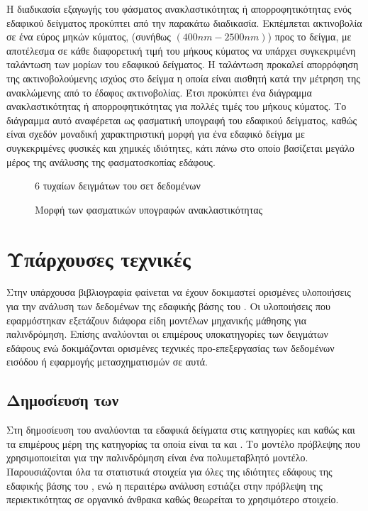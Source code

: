 Η διαδικασία εξαγωγής του φάσματος ανακλαστικότητας ή απορροφητικότητας ενός εδαφικού δείγματος προκύπτει από την παρακάτω διαδικασία. Εκπέμπεται ακτινοβολία σε ένα εύρος μηκών κύματος, (συνήθως $\left(400nm -
2500nm\right)$) προς το δείγμα, με αποτέλεσμα σε κάθε διαφορετική τιμή του μήκους κύματος να υπάρχει συγκεκριμένη ταλάντωση των μορίων του εδαφικού δείγματος. Η ταλάντωση προκαλεί απορρόφηση της ακτινοβολούμενης ισχύος στο δείγμα η οποία είναι αισθητή κατά την μέτρηση της ανακλώμενης από το έδαφος ακτινοβολίας. Έτσι προκύπτει ένα διάγραμμα ανακλαστικότητας ή απορροφητικότητας για πολλές τιμές του μήκους κύματος. Το διάγραμμα αυτό αναφέρεται ως φασματική υπογραφή του εδαφικού δείγματος, καθώς είναι σχεδόν μοναδική χαρακτηριστική μορφή για ένα εδαφικό δείγμα με συγκεκριμένες φυσικές και χημικές ιδιότητες, κάτι πάνω στο οποίο βασίζεται μεγάλο μέρος της ανάλυσης της φασματοσκοπίας εδάφους.

\begin{figure}[H]
  \begin{center}
    
    \caption{Μορφή των φασματικών υπογραφών ανακλαστικότητας } 6 τυχαίων δειγμάτων του σετ δεδομένων
  \end{center}
\end{figure}

\section{Υπάρχουσες τεχνικές}
Στην υπάρχουσα βιβλιογραφία φαίνεται να έχουν δοκιμαστεί ορισμένες υλοποιήσεις για την ανάλυση των δεδομένων της εδαφικής βάσης του . Οι υλοποιήσεις που εφαρμόστηκαν εξετάζουν διάφορα είδη μοντέλων μηχανικής μάθησης για παλινδρόμηση. Επίσης αναλύονται οι επιμέρους υποκατηγορίες των δειγμάτων εδάφους ενώ δοκιμάζονται ορισμένες τεχνικές προ-επεξεργασίας των δεδομένων εισόδου ή εφαρμογής μετασχηματισμών σε αυτά.

\subsection{Δημοσίευση των }
Στη δημοσίευση του  \cite{stevens_lucas_soil} αναλύονται τα εδαφικά δείγματα στις κατηγορίες  και  καθώς και τα επιμέρους μέρη της κατηγορίας  τα οποία είναι τα  και . Το μοντέλο πρόβλεψης που χρησιμοποιείται για την παλινδρόμηση είναι ένα πολυμεταβλητό μοντέλο. Παρουσιάζονται όλα τα στατιστικά στοιχεία για όλες της ιδιότητες εδάφους της εδαφικής βάσης του , ενώ η περαιτέρω ανάλυση εστιάζει στην πρόβλεψη της περιεκτικότητας σε οργανικό άνθρακα καθώς θεωρείται το χρησιμότερο στοιχείο.

